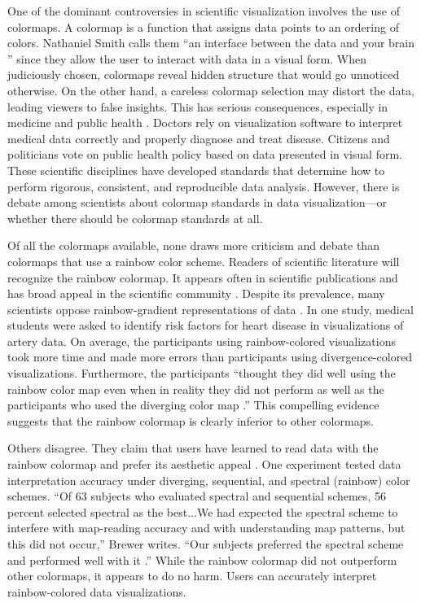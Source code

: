\documentclass[journal,12pt]{IEEEtran}
\begin{document}
One of the dominant controversies in scientific visualization involves the use of colormaps.
A colormap is a function that assigns data points to
an ordering of colors. Nathaniel Smith
calls them ``an interface between the data and your
brain \cite{viridis}'' since they allow the user to interact with data in a visual form.
When judiciously chosen, colormaps reveal hidden structure that would go unnoticed
otherwise. On the other hand, a careless colormap selection may distort the data,
leading viewers to false insights. This has
serious consequences, especially in medicine and public health \cite{arteryvis,choropleth}.
Doctors rely on visualization software to interpret medical
data correctly and properly diagnose and treat disease.
Citizens and politicians vote on public health policy based on data presented 
in visual form. These scientific disciplines have developed standards that determine
how to perform rigorous, consistent, and reproducible data analysis. However,
there is debate among scientists about colormap standards in data visualization---or
whether there should be colormap standards at all.

Of all the colormaps available, none draws more criticism and debate than colormaps that use a rainbow
color scheme. Readers of scientific literature will recognize the rainbow colormap. 
It appears often in scientific publications and has 
broad appeal in the scientific community
\cite{endofrainbow, rainbowstill, spectralschemes,choropleth}.
Despite its prevalence, 
many scientists oppose rainbow-gradient representations of data
\cite{rainbowstill, endofrainbow, viridis,arteryvis}.
In one study, medical students were
asked to identify risk factors for heart disease in visualizations
of artery data. On average, the participants
using rainbow-colored visualizations took more time
and made more errors than participants using divergence-colored visualizations. 
Furthermore, the participants ``thought they did well using the rainbow color
map even when in reality they did not perform as well
as the participants who used the diverging color map
\cite{arteryvis}.'' This compelling evidence suggests
that the rainbow colormap is clearly inferior to other
colormaps.

Others disagree. They claim that users have learned to
read data with the rainbow colormap and prefer its
aesthetic appeal \cite{spectralschemes, choropleth}. One
experiment tested data interpretation accuracy under
diverging, sequential, and spectral (rainbow) color
schemes. ``Of 63 subjects who evaluated spectral and
sequential schemes, 56 percent selected spectral as the
best...We had expected the spectral scheme to interfere
with map-reading accuracy and with understanding
map patterns, but this did not occur,'' Brewer writes.
``Our subjects preferred the spectral scheme
and performed well with it \cite{spectralschemes}.''
While the rainbow colormap did not outperform other colormaps, it
appears to do no harm. Users can accurately interpret
rainbow-colored data visualizations.
\end{document}

